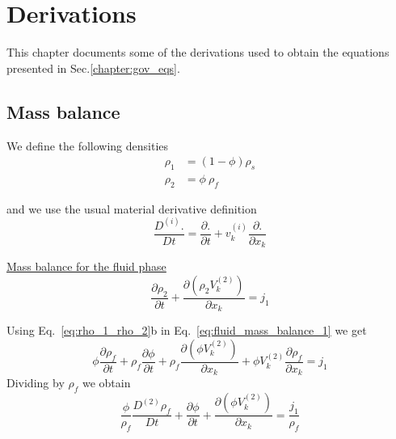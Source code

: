 \documentclass[]{scrreprt}
\begin{document}
\appendix

\chapter{Derivations}
This chapter documents some of the derivations used to obtain the equations presented in Sec.\ref{chapter:gov_eqs}.

\section{Mass balance}
We define the following densities
\begin{subequations}
  \label{eq:rho_1_rho_2}
  \begin{align}
    \rho_1 &= (1-\phi)\rho_s \\
    \rho_2 &= \phi \: \rho_f  
  \end{align}
\end{subequations}

and we use the usual material derivative definition
\begin{equation}
  \label{eq:material_derivative}
  \frac{D^{(i)}.}{D t} = \frac{\partial.}{\partial t} + v^{(i)}_k \frac{\partial.}{\partial x_k}
\end{equation}


\underline{Mass balance for the fluid phase}
\begin{equation}
  \label{eq:fluid_mass_balance_1}
  \frac{\partial \rho_2}{\partial t} + \frac{\partial( \rho_2 V^{(2)}_k)}{\partial x_k}= j_1
\end{equation}

Using Eq.~\ref{eq:rho_1_rho_2}b in Eq.~\ref{eq:fluid_mass_balance_1} we get
\begin{equation}
  \label{eq:fluid_mass_balance_2}
  \phi \frac{\partial \rho_f }{\partial t} + \rho_f\frac{\partial \phi }{\partial t} + \rho_f\frac{\partial( \phi V^{(2)}_k)}{\partial x_k}+ \phi V^{(2)}_k\frac{\partial\rho_f}{\partial x_k} = j_1
\end{equation}
Dividing by $\rho_f$ we obtain
\begin{equation}
  \label{eq:fluid_mass_balance}
  \frac{\phi}{\rho_f} \frac{D^{(2)} \rho_f }{D t} + \frac{\partial \phi }{\partial t} + \frac{\partial( \phi V^{(2)}_k)}{\partial x_k} = \frac{j_1}{\rho_f}
\end{equation}
\end{document}
